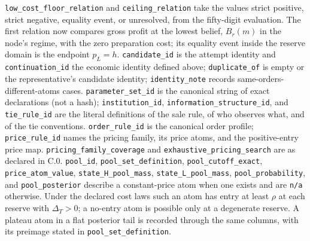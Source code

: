 \texttt{low\_cost\_floor\_relation} and \texttt{ceiling\_relation} take
the values strict positive, strict negative, equality event, or
unresolved, from the fifty-digit evaluation. The first relation now compares
gross profit at the lowest belief, \(B_r(m)\) in the node's regime, with the
zero preparation cost; its equality event inside the reserve domain is the
endpoint \(p_L=h\). \texttt{candidate\_id} is
the attempt identity and \texttt{continuation\_id} the economic identity
defined above; \texttt{duplicate\_of} is empty or the representative's
candidate identity; \texttt{identity\_note} records
same-orders-different-atoms cases. \texttt{parameter\_set\_id} is the
canonical string of exact declarations (not a hash);
\texttt{institution\_id}, \texttt{information\_structure\_id}, and
\texttt{tie\_rule\_id} are the literal definitions of the sale rule, of
who observes what, and of the tie conventions. \texttt{order\_rule\_id}
is the canonical order profile; \texttt{price\_rule\_id} names the
pricing family, its price atoms, and the positive-entry price map.
\texttt{pricing\_family\_coverage} and
\texttt{exhaustive\_pricing\_search} are as declared in C.0.
\texttt{pool\_id}, \texttt{pool\_set\_definition},
\texttt{pool\_cutoff\_exact}, \texttt{price\_atom\_value},
\texttt{state\_H\_pool\_mass}, \texttt{state\_L\_pool\_mass},
\texttt{pool\_probability}, and \texttt{pool\_posterior} describe a
constant-price atom when one exists and are \texttt{n/a} otherwise. Under the
declared cost laws such an atom has entry at least \(\rho\) at each reserve
with \(\Delta_T>0\); a no-entry atom is possible only at a degenerate reserve.
A plateau atom in a flat posterior tail is recorded through the same columns,
with its preimage stated in \texttt{pool\_set\_definition}.
